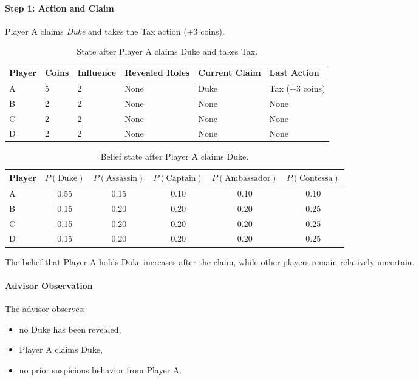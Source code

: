 \documentclass[11pt]{article}
\begin{document}
\paragraph{Step 1: Action and Claim}
Player A claims \textit{Duke} and takes the Tax action (+3 coins).

\begin{table}[H]
\centering
\caption{State after Player A claims Duke and takes Tax.}
\label{tab:state-duke}
\begin{tabular}{llllll}
\toprule
Player & Coins & Influence & Revealed Roles & Current Claim & Last Action \\
\midrule
A & 5 & 2 & None & Duke & Tax (+3 coins) \\
B & 2 & 2 & None & None & None \\
C & 2 & 2 & None & None & None \\
D & 2 & 2 & None & None & None \\
\bottomrule
\end{tabular}
\end{table}

\begin{table}[H]
\centering
\caption{Belief state after Player A claims Duke.}
\label{tab:belief-duke}
\begin{tabular}{lccccc}
\toprule
Player & $P(\mathrm{Duke})$ & $P(\mathrm{Assassin})$ & $P(\mathrm{Captain})$ & $P(\mathrm{Ambassador})$ & $P(\mathrm{Contessa})$ \\
\midrule
A & 0.55 & 0.15 & 0.10 & 0.10 & 0.10 \\
B & 0.15 & 0.20 & 0.20 & 0.20 & 0.25 \\
C & 0.15 & 0.20 & 0.20 & 0.20 & 0.25 \\
D & 0.15 & 0.20 & 0.20 & 0.20 & 0.25 \\
\bottomrule
\end{tabular}
\end{table}
The belief that Player A holds Duke increases after the claim, while other players remain relatively uncertain.

\paragraph{Advisor Observation}
The advisor observes:
\begin{itemize}
    \item no Duke has been revealed,
    \item Player A claims Duke,
    \item no prior suspicious behavior from Player A.
\end{itemize}
\end{document}
